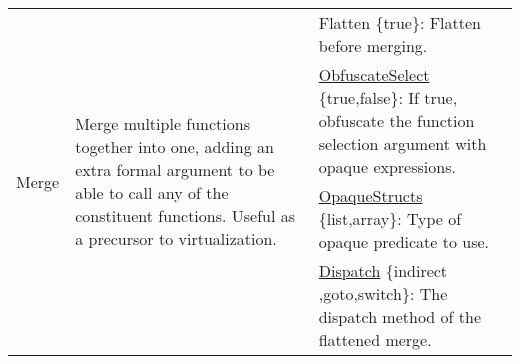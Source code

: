 \begin{table*}[!hp]
\begin{tabular}{|p{2.25cm}|p{4cm}|p{11cm}|}
\multirow{7}{*}{Merge}               & \multirow{7}{4cm}{Merge multiple functions together into one, adding an extra formal argument to be able to call any of the constituent functions. Useful as a precursor to virtualization.
}                                                                                                                                                                                                             & Flatten \{true\}: Flatten before merging.                                                                                                                                                                                                                                                                                                                \\ \cline{3-3} 
                                     &                                                                                                                                                                                                                                                                                                         & \underline{ObfuscateSelect} \{true,false\}: If true, obfuscate the function selection argument with opaque expressions.                                                                                                                                                                                                               \\ \cline{3-3} 
                                     &                                                                                                                                                                                                                                                                                                         & \underline{OpaqueStructs} \{list,array\}: Type of opaque predicate to use.                                                                                                                                                                                                                                                       \\ \cline{3-3} 
                                     &                                                                                                                                                                                                                                                                                                         & \underline{Dispatch} \{indirect ,goto,switch\}: The dispatch method of the flattened merge.                                                                                                                       \\ \cline{3-3} 

\end{tabular}
\end{table*}
